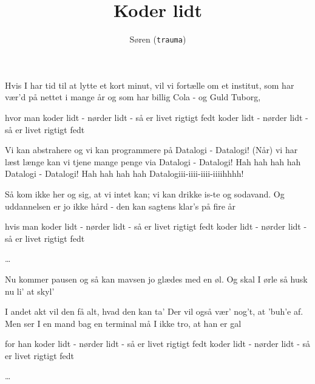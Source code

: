 \documentclass[danish]{article}
\title{Koder lidt}
\author{Søren (\texttt{trauma})}
\begin{document}
\maketitle
\begin{song}
 Hvis I har tid til at lytte et kort minut,
vil vi fortælle om et institut,
som har vær'd på nettet i mange år
og som har billig Cola - og Guld Tuborg,

hvor man 
koder lidt - nørder lidt - så er livet rigtigt fedt
koder lidt - nørder lidt - så er livet rigtigt fedt

 Vi kan abstrahere og vi kan programmere på Datalogi - Datalogi!
(Når) vi har læst længe kan vi tjene mange penge via Datalogi - Datalogi!
Hah hah hah hah Datalogi - Datalogi!
Hah hah hah hah Datalogiii-iiii-iiii-iiiihhhh!

 Så kom ikke her og sig, at vi intet kan;
vi kan drikke is-te og sodavand.
Og uddannelsen er jo ikke hård -
den kan sagtens klar's på fire år

hvis man
koder lidt - nørder lidt - så er livet rigtigt fedt
koder lidt - nørder lidt - så er livet rigtigt fedt

 \ldots{}

 Nu kommer pausen 
og så kan mavsen
jo glædes med en øl.
Og skal I ørle
så husk nu li' at skyl'

 I andet akt vil den få alt, hvad den kan ta'
Der vil også vær' nog't, at 'buh'e af.
Men ser I en mand bag en terminal
må I ikke tro, at han er gal

for han
koder lidt - nørder lidt - så er livet rigtigt fedt
koder lidt - nørder lidt - så er livet rigtigt fedt

 \ldots

\end{song}
\end{document}
